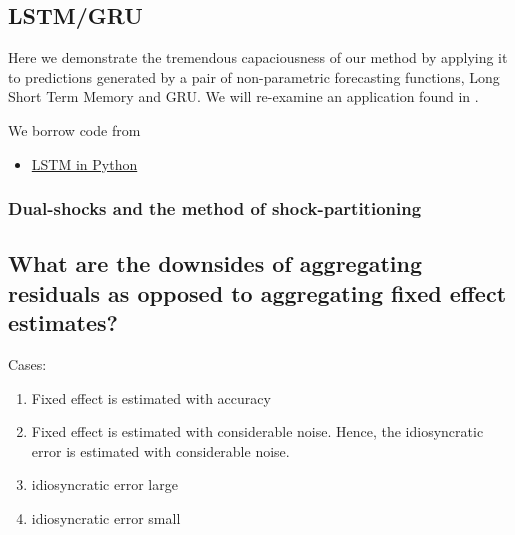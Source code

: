 \documentclass[11pt]{article}
\theoremstyle{definition}
\begin{document}
\subsection{LSTM/GRU}

Here we demonstrate the tremendous capaciousness of our method by applying it to predictions generated by a pair of non-parametric forecasting functions, Long Short Term Memory and GRU.  We will re-examine an application found in \cite{lin2021minimizing}.

We borrow code from \cite{Brownlee_2022}

\begin{itemize}
  \item \href{https://machinelearningmastery.com/time-series-prediction-lstm-recurrent-neural-networks-python-keras/}{LSTM in Python}
\end{itemize}

\subsubsection{Dual-shocks and the method of shock-partitioning}

\subsection{What are the downsides of aggregating residuals as opposed to aggregating fixed effect estimates?}

Cases:
\begin{enumerate}
  \item Fixed effect is estimated with accuracy 
  \item Fixed effect is estimated with considerable noise.  Hence, the idiosyncratic error is estimated with considerable noise.
  \item idiosyncratic error large
  \item idiosyncratic error small
\end{enumerate}  
\end{document}
